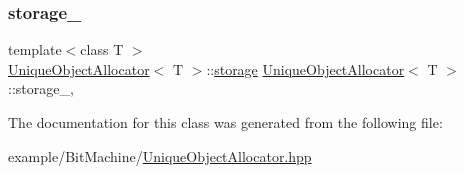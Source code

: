 \mbox{\label{class_unique_object_allocator_ad684f842780e3afc1fdbacabc0d7cd5b}} 
\subsubsection{\texorpdfstring{storage\+\_\+}{storage\_}}
{\footnotesize\ttfamily template$<$class T $>$ \\
\mbox{\hyperlink{class_unique_object_allocator}{Unique\+Object\+Allocator}}$<$ T $>$\+::\mbox{\hyperlink{union_unique_object_allocator_1_1storage}{storage}} \mbox{\hyperlink{class_unique_object_allocator}{Unique\+Object\+Allocator}}$<$ T $>$\+::storage\+\_\+\hspace{0.3cm}{\ttfamily [static]}, {\ttfamily [private]}}



The documentation for this class was generated from the following file\+:\begin{DoxyCompactItemize}
\item 
example/\+Bit\+Machine/\mbox{\hyperlink{_unique_object_allocator_8hpp}{Unique\+Object\+Allocator.\+hpp}}\end{DoxyCompactItemize}

